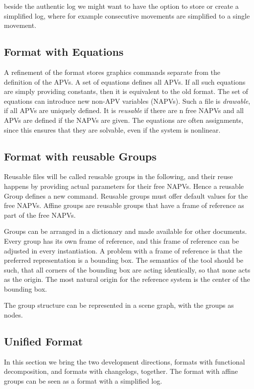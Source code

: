 \documentclass{sig-alternate}
\begin{document}
beside the authentic log we might want to have the option to store or create a simplified log, where for example consecutive movements are simplified to a single movement.

\subsection{Format with Equations}
A refinement of the format stores graphics commands separate from the definition of the APVs.
A set of equations defines all APVs. If all such equations are simply providing constants, then it is equivalent to the old format. 
The set of equations can introduce new non-APV variables (NAPVs). Such a file is \textit{drawable}, if all APVs are uniquely defined. It is \textit{reusable} if there are n free NAPVs and all APVs are defined if the NAPVs are given.  
The equations are often assignments, since this ensures that they are solvable, even if the system is nonlinear.

\subsection{Format with reusable Groups}
Reusable files will be called reusable groups in the following, and their reuse happens by providing actual parameters
for their free NAPVs. Hence a reusable Group defines a new command.
Reusable groups must offer default values for the free NAPVs.  
Affine groups are reusable groups that have a frame of reference as part of the free NAPVs.

Groups can be arranged in a dictionary and made available for other documents. Every group has its own frame of reference, and this frame of reference can be adjusted in every instantiation. 
A problem with a frame of reference is that the preferred representation is a bounding box. The semantics of the tool should be such, that all corners of the bounding box are acting identically, so that none acts as the origin. The most natural origin for the reference system is the center of the bounding box.

The group structure can be represented in a scene graph, with the groups as nodes.

\subsection{Unified Format}
In this section we bring the two development directions, formats with functional decomposition, and formats with changelogs, together.
The format with affine groups can be seen as a format with a simplified log.
\end{document}
